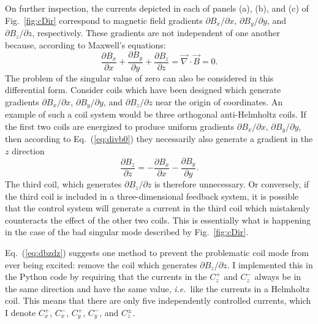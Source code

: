

On further inspection, the currents depicted in each of panels (a),
(b), and (c) of Fig.~\ref{fig:cDir} correspond to magnetic field
gradients $\partial B_x/\partial x$, $\partial B_y/\partial y$, and
$\partial B_z/\partial z$, respectively.  These gradients are not
independent of one another because, according to Maxwell's equations:
\begin{equation}
\frac{\partial B_x}{\partial x}+\frac{\partial B_y}{\partial y}+\frac{\partial B_z}{\partial z}=\vec{\nabla}\cdot\vec{B}=0.\label{eq:divb0}
\end{equation}
The problem of the singular value of zero can also be considered in
this differential form.  Consider coils which have been designed which
generate gradients $\partial B_x/\partial x$, $\partial B_y/\partial
y$, and $\partial B_z/\partial z$ near the origin of coordinates.  An
example of such a coil system would be three orthogonal anti-Helmholtz
coils.  If the first two coils are energized to produce uniform
gradients $\partial B_x/\partial x$, $\partial B_y/\partial y$, then
according to Eq.~(\ref{eq:divb0}) they necessarily also generate a
gradient in the $z$ direction
\begin{equation}
\frac{\partial B_z}{\partial z}=-\frac{\partial B_x}{\partial x}-\frac{\partial B_y}{\partial y}.\label{eq:dbzdz}
\end{equation}
The third coil, which generates $\partial B_z/\partial z$ is
therefore unnecessary.  Or conversely, if the third coil is included
in a three-dimensional feedback system, it is possible that the
control system will generate a current in the third coil which
mistakenly counteracts the effect of the other two coils.  This is
essentially what is happening in the case of the bad singular mode
described by Fig.~\ref{fig:cDir}.

Eq.~(\ref{eq:dbzdz}) suggests one method to prevent the problematic
coil mode from ever being excited: remove the coil which generates
$\partial B_z/\partial z$.  I implemented this in the Python
code by requiring that the currents in the $C_z^+$ and $C_z^-$ always
be in the same direction and have the same value, {\it i.e.}~like the
currents in a Helmholtz coil.  This means that there are only five
independently controlled currents, which I denote $C_x^+$, $C_x^-$,
$C_y^+$, $C_y^-$, and $C_z^\pm$.

